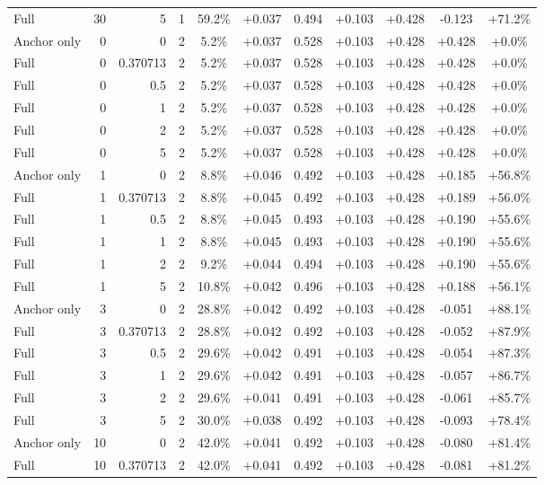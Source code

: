 \begin{table}[htbp]
\begin{tabular}{lrrrccccccc}
Full & 30 & 5 & 1 & 59.2\% & +0.037 & 0.494 & +0.103 & +0.428 & -0.123 & +71.2\% \\
Anchor only & 0 & 0 & 2 & 5.2\% & +0.037 & 0.528 & +0.103 & +0.428 & +0.428 & +0.0\% \\
Full & 0 & 0.370713 & 2 & 5.2\% & +0.037 & 0.528 & +0.103 & +0.428 & +0.428 & +0.0\% \\
Full & 0 & 0.5 & 2 & 5.2\% & +0.037 & 0.528 & +0.103 & +0.428 & +0.428 & +0.0\% \\
Full & 0 & 1 & 2 & 5.2\% & +0.037 & 0.528 & +0.103 & +0.428 & +0.428 & +0.0\% \\
Full & 0 & 2 & 2 & 5.2\% & +0.037 & 0.528 & +0.103 & +0.428 & +0.428 & +0.0\% \\
Full & 0 & 5 & 2 & 5.2\% & +0.037 & 0.528 & +0.103 & +0.428 & +0.428 & +0.0\% \\
Anchor only & 1 & 0 & 2 & 8.8\% & +0.046 & 0.492 & +0.103 & +0.428 & +0.185 & +56.8\% \\
Full & 1 & 0.370713 & 2 & 8.8\% & +0.045 & 0.492 & +0.103 & +0.428 & +0.189 & +56.0\% \\
Full & 1 & 0.5 & 2 & 8.8\% & +0.045 & 0.493 & +0.103 & +0.428 & +0.190 & +55.6\% \\
Full & 1 & 1 & 2 & 8.8\% & +0.045 & 0.493 & +0.103 & +0.428 & +0.190 & +55.6\% \\
Full & 1 & 2 & 2 & 9.2\% & +0.044 & 0.494 & +0.103 & +0.428 & +0.190 & +55.6\% \\
Full & 1 & 5 & 2 & 10.8\% & +0.042 & 0.496 & +0.103 & +0.428 & +0.188 & +56.1\% \\
Anchor only & 3 & 0 & 2 & 28.8\% & +0.042 & 0.492 & +0.103 & +0.428 & -0.051 & +88.1\% \\
Full & 3 & 0.370713 & 2 & 28.8\% & +0.042 & 0.492 & +0.103 & +0.428 & -0.052 & +87.9\% \\
Full & 3 & 0.5 & 2 & 29.6\% & +0.042 & 0.491 & +0.103 & +0.428 & -0.054 & +87.3\% \\
Full & 3 & 1 & 2 & 29.6\% & +0.042 & 0.491 & +0.103 & +0.428 & -0.057 & +86.7\% \\
Full & 3 & 2 & 2 & 29.6\% & +0.041 & 0.491 & +0.103 & +0.428 & -0.061 & +85.7\% \\
Full & 3 & 5 & 2 & 30.0\% & +0.038 & 0.492 & +0.103 & +0.428 & -0.093 & +78.4\% \\
Anchor only & 10 & 0 & 2 & 42.0\% & +0.041 & 0.492 & +0.103 & +0.428 & -0.080 & +81.4\% \\
Full & 10 & 0.370713 & 2 & 42.0\% & +0.041 & 0.492 & +0.103 & +0.428 & -0.081 & +81.2\% \\

\end{tabular}
\end{table}
